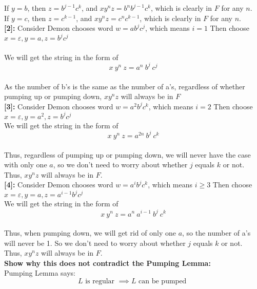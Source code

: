 \documentclass [9 pt]{article}
\theoremstyle{definition}
\begin{document}
If $y=b$, then $z = b^{j-1} c^{k}$, and $xy^nz = b^n b^{j-1} c^{k}$, which is clearly in $F$ for any $n$.\\
\newline
If $y=c$, then $z =  c^{k - 1}$, and $xy^nz = c^n c^{k-1}$, which is clearly in $F$ for any $n$.\\
\newline
\newline
\textbf{[2]:} Consider Demon chooses word $w = a b^{j}c^{j}$, which means $i = 1$ Then choose $x= \varepsilon ,y = a, z = b^{j}c^{j} $\\\\
We will get the string in the form of $$x\ y^n\ z = a^n\ b^j\ c^j$$\\
As the number of b's is the same as the number of a's, regardless of whether pumping up or pumping down, $xy^nz $ will always be in $F$\\
\newpage
\textbf{[3]:} Consider Demon chooses word $w = a^2 b^{j}c^{k}$, which means $i = 2$ Then choose $x= \varepsilon ,y = a^2, z = b^{j}c^{j} $\\
\newline
We will get the string in the form of $$x\ y^{n}\ z = a^{2n}\ b^j\ c^k$$\\
Thus, regardless of pumping up or pumping down, we will never have the case with only one $a$, so we don't need to worry about whether $j$ equals $k$ or not.\\
Thus, $xy^nz $ will always be in $F$.\\
\newline\newline
\textbf{[4]:} Consider Demon chooses word $w = a^i b^{j}c^{k}$, which means $i \geq 3$ Then choose $x= \varepsilon ,y = a, z = a^{i - 1} b^{j}c^{j} $\\
\newline
We will get the string in the form of $$x\ y^{n}\ z = a^{n}\ a^{i - 1} \ b^j\ c^k$$\\
Thus, when pumping down, we will get rid of only one $a$, so the number of a's will never be 1. So we don't need to worry about whether $j$ equals $k$ or not.\\
Thus, $xy^nz $ will always be in $F$.\\
\newline
\newline
\newline
\textbf{Show why this does not contradict the Pumping Lemma:}\\
Pumping Lemma says:
$$ L \text{ is regular }\implies L \text{ can be pumped } $$\\
\end{document}
